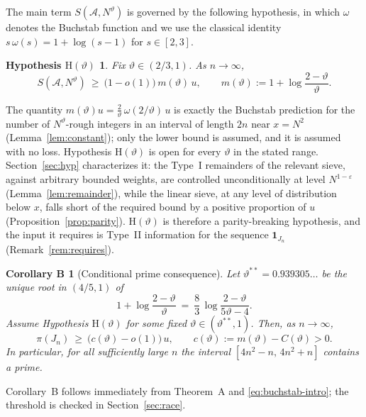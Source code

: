\documentclass[11pt]{article}
\newtheorem*{corollaryB}{Corollary B}
\newtheorem*{hypH}{Hypothesis $\mathrm{H}(\vartheta)$}
\theoremstyle{remark}
\newcommand{\N}{N}
\newcommand{\J}{J_n}
\newcommand{\A}{\mathcal{A}}
\newcommand{\thstar}{\vartheta^{**}}
\begin{document}
The main term $S(\A,\N^{\vartheta})$ is governed by the following hypothesis, in which
$\omega$ denotes the Buchstab function and we use the classical identity
$s\,\omega(s)=1+\log(s-1)$ for $s\in[2,3]$.

\begin{hypH}
Fix $\vartheta\in(2/3,1)$. As $n\to\infty$,
\[
S(\A,\N^{\vartheta})\ \ge\ \bigl(1-o(1)\bigr)\,m(\vartheta)\,u,
\qquad m(\vartheta):=1+\log\frac{2-\vartheta}{\vartheta}.
\]
\end{hypH}

The quantity $m(\vartheta)u=\frac{2}{\vartheta}\,\omega(2/\vartheta)\,u$ is exactly
the Buchstab prediction for the number of $\N^{\vartheta}$-rough integers in an
interval of length $2n$ near $x=\N^2$ (Lemma~\ref{lem:constant}); only the lower bound
is assumed, and it is assumed with no loss. Hypothesis $\mathrm{H}(\vartheta)$ is open
for every $\vartheta$ in the stated range. Section~\ref{sec:hyp} characterizes it:
the Type~I remainders of the relevant sieve, against arbitrary bounded weights, are
controlled unconditionally at level $\N^{1-\varepsilon}$ (Lemma~\ref{lem:remainder}),
while the linear sieve, at any level of distribution below $x$, falls short of the
required bound by a positive proportion of $u$ (Proposition~\ref{prop:parity}).
$\mathrm{H}(\vartheta)$ is therefore a parity-breaking hypothesis, and the input it
requires is Type~II information for the sequence $\mathbf{1}_{\J}$
(Remark~\ref{rem:requires}).

\begin{corollaryB}[Conditional prime consequence]
Let $\thstar=0.939305\ldots$ be the unique root in $(4/5,1)$ of
\begin{equation}\label{eq:threshold}
1+\log\frac{2-\vartheta}{\vartheta}\ =\ \frac83\,\log\frac{2-\vartheta}{5\vartheta-4}.
\end{equation}
Assume Hypothesis $\mathrm{H}(\vartheta)$ for some fixed $\vartheta\in(\thstar,1)$.
Then, as $n\to\infty$,
\[
\pi(\J)\ \ge\ \bigl(c(\vartheta)-o(1)\bigr)\,u,\qquad
c(\vartheta):=m(\vartheta)-C(\vartheta)>0 .
\]
In particular, for all sufficiently large $n$ the interval $[4n^2-n,\,4n^2+n]$
contains a prime.
\end{corollaryB}

Corollary~B follows immediately from Theorem~A and \eqref{eq:buchstab-intro}; the threshold is checked in Section~\ref{sec:race}.
\end{document}
